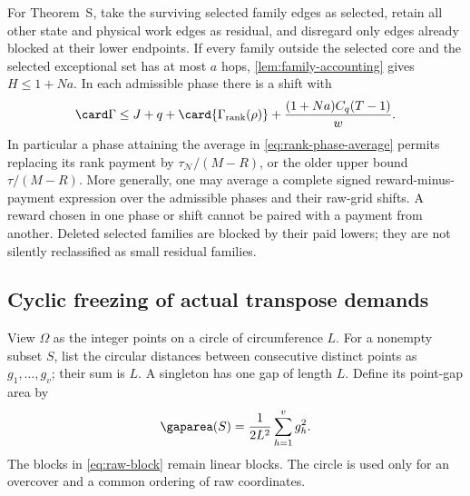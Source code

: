 For Theorem~S, take the surviving selected family edges as selected,
retain all other state and physical work edges as residual, and disregard
only edges already blocked at their lower endpoints. If every family
outside the selected core and the selected exceptional set has at most
$a$ hops,
\cref{lem:family-accounting} gives $H\le1+Na$. In each admissible phase
there is a shift with
\begin{equation}\label{eq:native-genie-ledger}
 \card\Gamma\le
 J+q+\card{\Gamma_{\rm rank}(\rho)}
       +\frac{(1+Na)C_q(T-1)}w.
\end{equation}
In particular a phase attaining the average in
\eqref{eq:rank-phase-average} permits replacing its rank payment by
$\tau_{\mathcal N}/(M-R)$, or the older upper bound $\tau/(M-R)$.
More generally, one may average a complete signed
reward-minus-payment expression over the admissible phases and their
raw-grid shifts. A reward chosen in one phase or shift cannot be paired
with a payment from another. Deleted selected families are blocked by
their paid lowers; they are not silently reclassified as small residual
families.

\subsection{Cyclic freezing of actual transpose demands}

View $\Omega$ as the integer points on a circle of circumference $L$.
For a nonempty subset $S$, list the circular distances between consecutive
distinct points as $g_1,\ldots,g_v$; their sum is $L$. A singleton has
one gap of length $L$. Define its point-gap area by
\begin{equation}\label{eq:gap-area}
 \gaparea(S)=\frac1{2L^2}\sum_{h=1}^v g_h^2.
\end{equation}
The blocks in \eqref{eq:raw-block} remain linear blocks. The circle is
used only for an overcover and a common ordering of raw coordinates.

